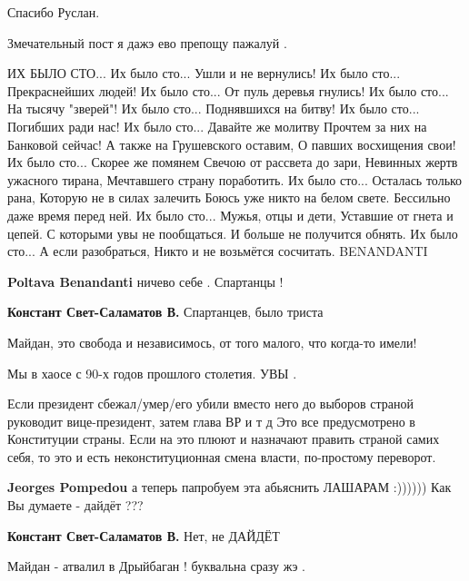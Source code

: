 \begin{itemize}
Спасибо Руслан.

Змечательный пост я дажэ ево препощу пажалуй .


\obeycr
ИХ БЫЛО СТО...
Их было сто... Ушли и не вернулись!
Их было сто... Прекраснейших людей!
Их было сто... От пуль деревья гнулись!
Их было сто... На тысячу "зверей"!
Их было сто... Поднявшихся на битву!
Их было сто... Погибших ради нас!
Их было сто... Давайте же молитву
Прочтем за них на Банковой сейчас!
А также на Грушевского оставим,
О павших восхищения свои!
Их было сто... Скорее же помянем
Свечою от рассвета до зари,
Невинных жертв ужасного тирана,
Мечтавшего страну поработить.
Их было сто... Осталась только рана,
Которую не в силах залечить
Боюсь уже никто на белом свете.
Бессильно даже время перед ней.
Их было сто... Мужья, отцы и дети,
Уставшие от гнета и цепей.
С которыми увы не пообщаться.
И больше не получится обнять.
Их было сто... А если разобраться,
Никто и не возьмётся сосчитать.
BENANDANTI
\restorecr

\begin{itemize} %
\textbf{Poltava Benandanti} ничево себе . Спартанцы !

\textbf{Констант Свет-Саламатов В.} Спартанцев, было триста
\end{itemize} %

Майдан, это свобода и независимось, от того малого, что когда-то имели!

Мы в хаосе с 90-х годов прошлого столетия. УВЫ .


Если президент сбежал/умер/его убили вместо него до выборов страной руководит
вице-президент, затем глава ВР и т д Это все предусмотрено в Конституции
страны. Если на это плюют и назначают править страной самих себя, то это и есть
неконституционная смена власти, по-простому переворот.

\begin{itemize} %
\textbf{Jeorges Pompedou} а теперь папробуем эта абьяснить ЛАШАРАМ :)))))) Как Вы думаете - дайдёт ???

\textbf{Констант Свет-Саламатов В.} Нет, не ДАЙДЁТ
\end{itemize} %

Майдан - атвалил в Дрыйбаган ! буквальна сразу жэ .


\end{itemize}

